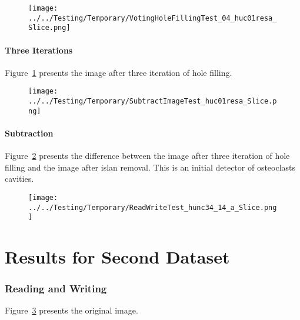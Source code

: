 \documentclass{InsightArticle}
\begin{document}
\clearpage
\begin{figure}
\center
\texttt{[image: ../../Testing/Temporary/VotingHoleFillingTest\_04\_huc01resa\_Slice.png]}
\label{fig:HoleFillingIteration03Image}
\end{figure}


\subsection{Three Iterations}

Figure~\ref{fig:HoleFillingIteration03Image} presents the image after three iteration of hole filling.



\clearpage
\begin{figure}
\center
\texttt{[image: ../../Testing/Temporary/SubtractImageTest\_huc01resa\_Slice.png]}
\label{fig:SubtractionImage}
\end{figure}

\subsection{Subtraction}

Figure~\ref{fig:SubtractionImage} presents the difference between the image
after three iteration of hole filling and the image after islan removal. This
is an initial detector of osteoclasts cavities.


\clearpage
\begin{figure}
\center
\texttt{[image: ../../Testing/Temporary/ReadWriteTest\_hunc34\_14\_a\_Slice.png]}
\label{fig:OriginalImage2}
\end{figure}

\part{Results for Second Dataset}

\section{Reading and Writing}

Figure~\ref{fig:OriginalImage2} presents the original image.
\end{document}
